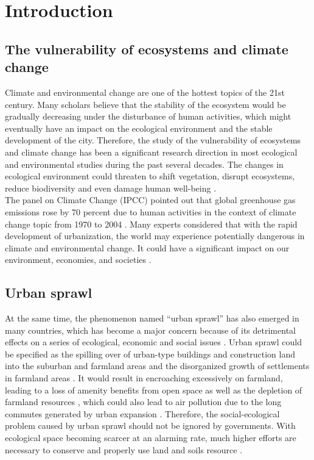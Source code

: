 \section{Introduction} 


\subsection{The vulnerability of ecosystems and climate change}
Climate and environmental change are one of the hottest topics of the 21st century. Many scholars believe that the stability of the ecosystem would be gradually decreasing under the disturbance of human activities, which might eventually have an impact on the ecological environment and the stable development of the city. Therefore, the study of the vulnerability of ecosystems and climate change has been a significant research direction in most ecological and environmental studies during the past several decades. The changes in ecological environment could threaten to shift vegetation, disrupt ecosystems, reduce biodiversity and even damage human well-being \parencite{gonzalez_global_2010}.\\

The panel on Climate Change (IPCC) pointed out that global greenhouse gas emissions rose by 70 percent due to human activities in the context of climate change topic from 1970 to 2004 \parencite{programme_buildings_2009}. Many experts considered that with the rapid development of urbanization, the world may experience potentially dangerous in climate and environmental change. It could have a significant impact on our environment, economies, and societies \parencite{graham_building_2009}.\\

\subsection{Urban sprawl}
At the same time, the phenomenon named “urban sprawl” has also emerged in many countries, which has become a major concern because of its detrimental effects on a series of ecological, economic and social issues \parencite{brueckner_urban_2001} \parencite{jaeger_suitability_2010}. Urban sprawl could be specified as the spilling over of urban-type buildings and construction land into the suburban and farmland areas and the disorganized growth of settlements in farmland areas \parencite{wackermann_handworterbuch_1968}. It would result in encroaching excessively on farmland, leading to a loss of amenity benefits from open space as well as the depletion of farmland resources \parencite{brueckner_urban_2001}, which could also lead to air pollution due to the long commutes generated by urban expansion \parencite{fenger_urban_1999}. Therefore, the social-ecological problem caused by urban sprawl should not be ignored by governments. With ecological space becoming scarcer at an alarming rate, much higher efforts are necessary to conserve and properly use land and soils resource \parencite{haber_energy_2007}.\\

